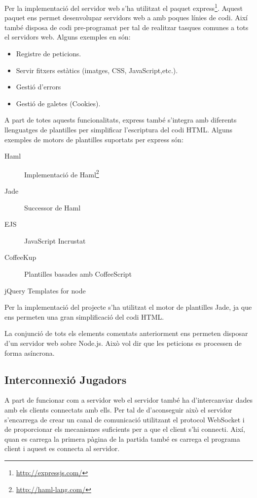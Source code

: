 Per la implementació del servidor web s'ha utilitzat el paquet express\footnote{\url{http://expressjs.com/}}. Aquest paquet ens permet desenvolupar servidors web a amb poques línies de codi. Així també disposa de codi pre-programat per tal de realitzar tasques comunes a tots el servidors web. Alguns exemples en són:

\begin{itemize}
\item{Registre de peticions.}
\item{Servir fitxers estàtics (imatges, CSS, JavaScript,etc.).}
\item{Gestió d'errors}
\item{Gestió de galetes (Cookies).}
\end{itemize}

A part de totes aquests funcionalitats, express també s'integra amb diferents llenguatges de plantilles per simplificar l'escriptura del codi HTML. Alguns exemples de motors de plantilles suportats per express són: 

\begin{description}
\item[Haml] {Implementació de Haml\footnote{\url{http://haml-lang.com/}} }
\item[Jade] {Successor de Haml}
\item[EJS] {JavaScript Incrustat}
\item[CoffeeKup] {Plantilles basades amb CoffeeScript}
\item[jQuery Templates for node]
\end{description}

Per la implementació del projecte s'ha utilitzat el motor de plantilles Jade, ja que ens permeten una gran simplificació del codi HTML.

La conjunció de tots els elements comentats anteriorment ens permeten disposar d'un servidor web sobre Node.js. Això vol dir que les peticions es processen de forma asíncrona. 

\subsection{Interconnexió Jugadors}
\label{sec:interconnexio-jugadors}
A part de funcionar com a servidor web el servidor també ha d'intercanviar dades amb els clients connectats amb ells. Per tal de d'aconseguir això el servidor s'encarrega de crear un canal de comunicació utilitzant el protocol WebSocket i de proporcionar els mecanismes suficients per a que el client s'hi connecti. Així, quan es carrega la primera pàgina de la partida també es carrega el programa client i aquest es connecta al servidor. 

